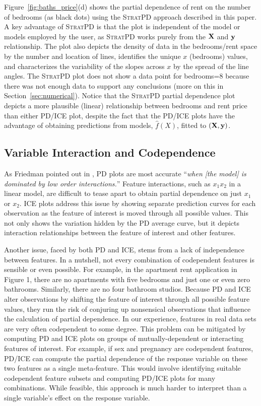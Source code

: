 \documentclass[12pt]{article}
\newcommand{\secref}[1]{Section~\ref{#1}}
\newcommand{\figref}[1]{Figure~\ref{#1}}
\newcommand{\todo}[1]{{{\color{red}{[#1]}}}}
\newcommand{\spd}{\fontfamily{cmr}\textsc{\small StratPD}}
\begin{document}
\figref{fig:baths_price}(d) shows the partial dependence of rent on the number of bedrooms (as black dots) using the \spd{} approach described in this paper.  A key advantage of \spd{} is that the plot is independent of the model or models employed by the user, as \spd{} works purely from the $\bf X$ and $\bf y$ relationship. The plot also depicts the density of data in the bedrooms/rent space by the number and location of lines, identifies the unique $x$ (bedrooms) values, and characterizes the variability of the slopes across $x$ by the spread of the line angles. The \spd{} plot does not show a data point for bedrooms=8 because there was not enough data to support any conclusions (more on this in \secref{sec:numerical}). Notice that the \spd{} partial dependence  plot depicts a more plausible (linear) relationship between bedrooms and rent price than either PD/ICE plot, despite the fact that the PD/ICE plots have the advantage of obtaining predictions from models, $\widehat{f}(X)$, fitted to $({\bf X}, {\bf y})$.

\subsection{Variable Interaction and Codependence}

As Friedman pointed out in \cite{PDP}, PD plots are most accurate ``{\em when {\em [the model]} is dominated by low order interactions.}''  Feature interactions, such as $x_1x_2$ in a linear model, are difficult to tease apart to obtain partial dependence on just $x_1$ or $x_2$.  ICE plots address this issue by showing separate prediction curves for each observation as the feature of interest is moved through all possible values.  This not only shows the variation hidden by the PD average curve, but it depicts interaction relationships between the feature of interest and other features. \todo{this really doesn't belong under codependence; it's a different issue. changed section title}

Another issue, faced by both PD and ICE, stems from a lack of independence between features. In a nutshell, not every combination of codependent features is sensible or even possible. For example, in the apartment rent application in Figure 1, there are no apartments with five bedrooms and just one or even zero bathrooms. Similarly, there are no four bathroom studios. Because PD and ICE alter observations by shifting the feature of interest through all possible feature values, they run the risk of conjuring up nonsensical observations that influence the calculation of partial dependence. In our experience, features in real data sets are very often codependent to some degree. This problem can be mitigated by computing PD and ICE plots on groups of mutually-dependent or interacting features of interest. For example, if sex and pregnancy are codependent features, PD/ICE can compute the partial dependence of the response variable on these two features as a single meta-feature.  This would involve identifying suitable codependent feature subsets and computing PD/ICE plots for many combinations. While feasible, this approach is much harder to interpret than a single variable's effect on the response variable.
\end{document}
